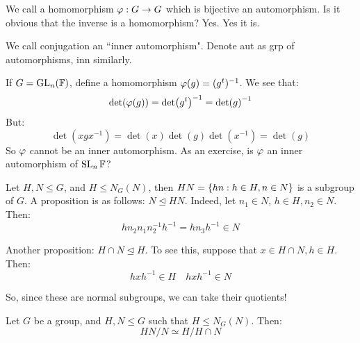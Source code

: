 
We call a homomorphism $ \operatorname{\varphi}: G \rightarrow G $ which is bijective an automorphism.
Is it obvious that the inverse is a homomorphism? Yes. Yes it is.

We call conjugation an ``inner automorphism".
Denote aut as grp of automorphisms, inn similarly.

\begin{xmp}[source=Primary Source Material]
    If $ G = \operatorname{GL}_{n}(\mathbb{F}) $, define a homomorphism $ \operatorname{\varphi}(g) = (g^{t})^{-1} $.
    We see that:
    \begin{equation*}
        \det(\operatorname{\varphi}(g)) = \det(g^{t})^{-1} = \det(g)^{-1}
    \end{equation*}
    But:
    \begin{equation*}
        \det(xgx^{-1}) = \det(x)\det(g)\det(x^{-1}) = \det(g)
    \end{equation*}
    So $ \operatorname{\varphi} $ cannot be an inner automorphism.
    As an exercise, is $ \operatorname{\varphi} $ an inner automorphism of $ \operatorname{SL}_{n}\mathbb{F} $?
\end{xmp}

Let $ H, N \leq G $, and $ H \leq N_{G}(N) $,
then $ HN = \left\{{hn : h \in H, n \in N}\right\} $ is a subgroup of $ G $.
A proposition is as follows: $ N \trianglelefteq HN $. \vsp
%
Indeed, let $ n_{1} \in N $, $ h \in H, n_{2} \in N $.
Then:
\begin{equation*}
    hn_{2}n_{1}n_{2}^{-1}h^{-1} = hn_{3}h^{-1} \in N
\end{equation*}

Another proposition: $ H \cap N \trianglelefteq H $.
To see this, suppose that $ x \in H \cap N, h \in H $. Then:
\begin{equation*}
    hxh^{-1} \in H \quad hxh^{-1} \in N
\end{equation*}

So, since these are normal subgroups, we can take their quotients!

\begin{thm}[title=Second Isomorphism Theorem (Diamond Isomorphism Theorem)]
    Let $ G $ be a group, and $ H, N \leq G $ such that $ H \leq N_{G}(N) $. Then:
    \begin{equation*}
        HN/N \simeq H/H\cap N
    \end{equation*}
\end{thm}

